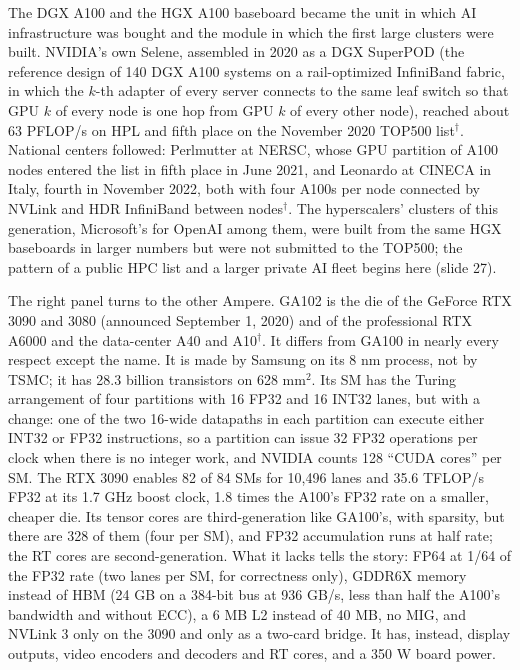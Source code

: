 \documentclass[11pt,letterpaper]{article}
\begin{document}
The DGX A100 and the HGX A100 baseboard became the unit in which AI infrastructure was bought and the module in which the first large clusters were built. NVIDIA's own Selene, assembled in 2020 as a DGX SuperPOD (the reference design of 140 DGX A100 systems on a rail-optimized InfiniBand fabric, in which the $k$-th adapter of every server connects to the same leaf switch so that GPU $k$ of every node is one hop from GPU $k$ of every other node), reached about 63 PFLOP/s on HPL and fifth place on the November 2020 TOP500 list$^\dagger$. National centers followed: Perlmutter at NERSC, whose GPU partition of A100 nodes entered the list in fifth place in June 2021, and Leonardo at CINECA in Italy, fourth in November 2022, both with four A100s per node connected by NVLink and HDR InfiniBand between nodes$^\dagger$. The hyperscalers' clusters of this generation, Microsoft's for OpenAI among them, were built from the same HGX baseboards in larger numbers but were not submitted to the TOP500; the pattern of a public HPC list and a larger private AI fleet begins here (slide 27).

The right panel turns to the other Ampere. GA102 is the die of the GeForce RTX 3090 and 3080 (announced September 1, 2020) and of the professional RTX A6000 and the data-center A40 and A10$^\dagger$. It differs from GA100 in nearly every respect except the name. It is made by Samsung on its 8 nm process, not by TSMC; it has 28.3 billion transistors on 628 mm$^2$. Its SM has the Turing arrangement of four partitions with 16 FP32 and 16 INT32 lanes, but with a change: one of the two 16-wide datapaths in each partition can execute either INT32 or FP32 instructions, so a partition can issue 32 FP32 operations per clock when there is no integer work, and NVIDIA counts 128 ``CUDA cores'' per SM. The RTX 3090 enables 82 of 84 SMs for 10,496 lanes and 35.6 TFLOP/s FP32 at its 1.7 GHz boost clock, 1.8 times the A100's FP32 rate on a smaller, cheaper die. Its tensor cores are third-generation like GA100's, with sparsity, but there are 328 of them (four per SM), and FP32 accumulation runs at half rate; the RT cores are second-generation. What it lacks tells the story: FP64 at 1/64 of the FP32 rate (two lanes per SM, for correctness only), GDDR6X memory instead of HBM (24 GB on a 384-bit bus at 936 GB/s, less than half the A100's bandwidth and without ECC), a 6 MB L2 instead of 40 MB, no MIG, and NVLink 3 only on the 3090 and only as a two-card bridge. It has, instead, display outputs, video encoders and decoders and RT cores, and a 350 W board power.
\end{document}
